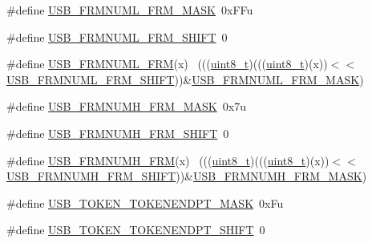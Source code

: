 \begin{DoxyCompactItemize}
\item 
\#define \hyperlink{group___u_s_b___register___masks_ga197f6ef10431b69cb9b84fe7241a318a}{U\+S\+B\+\_\+\+F\+R\+M\+N\+U\+M\+L\+\_\+\+F\+R\+M\+\_\+\+M\+A\+SK}~0x\+F\+Fu
\item 
\#define \hyperlink{group___u_s_b___register___masks_ga723c2de82420db0c349049ad6f66ad14}{U\+S\+B\+\_\+\+F\+R\+M\+N\+U\+M\+L\+\_\+\+F\+R\+M\+\_\+\+S\+H\+I\+FT}~0
\item 
\#define \hyperlink{group___u_s_b___register___masks_ga5002850109b676e53ed7862ba73b6662}{U\+S\+B\+\_\+\+F\+R\+M\+N\+U\+M\+L\+\_\+\+F\+RM}(x)                                          ~(((\hyperlink{_p_e___types_8h_aba7bc1797add20fe3efdf37ced1182c5}{uint8\+\_\+t})(((\hyperlink{_p_e___types_8h_aba7bc1797add20fe3efdf37ced1182c5}{uint8\+\_\+t})(x))$<$$<$\hyperlink{group___u_s_b___register___masks_ga723c2de82420db0c349049ad6f66ad14}{U\+S\+B\+\_\+\+F\+R\+M\+N\+U\+M\+L\+\_\+\+F\+R\+M\+\_\+\+S\+H\+I\+FT}))\&\hyperlink{group___u_s_b___register___masks_ga197f6ef10431b69cb9b84fe7241a318a}{U\+S\+B\+\_\+\+F\+R\+M\+N\+U\+M\+L\+\_\+\+F\+R\+M\+\_\+\+M\+A\+SK})
\item 
\#define \hyperlink{group___u_s_b___register___masks_ga436241a677d27ecae3001b228b51f536}{U\+S\+B\+\_\+\+F\+R\+M\+N\+U\+M\+H\+\_\+\+F\+R\+M\+\_\+\+M\+A\+SK}~0x7u
\item 
\#define \hyperlink{group___u_s_b___register___masks_gacb18c63687d37e245a79d7e7551823a3}{U\+S\+B\+\_\+\+F\+R\+M\+N\+U\+M\+H\+\_\+\+F\+R\+M\+\_\+\+S\+H\+I\+FT}~0
\item 
\#define \hyperlink{group___u_s_b___register___masks_ga34958377bceb661237ecc7ff5309def7}{U\+S\+B\+\_\+\+F\+R\+M\+N\+U\+M\+H\+\_\+\+F\+RM}(x)                                          ~(((\hyperlink{_p_e___types_8h_aba7bc1797add20fe3efdf37ced1182c5}{uint8\+\_\+t})(((\hyperlink{_p_e___types_8h_aba7bc1797add20fe3efdf37ced1182c5}{uint8\+\_\+t})(x))$<$$<$\hyperlink{group___u_s_b___register___masks_gacb18c63687d37e245a79d7e7551823a3}{U\+S\+B\+\_\+\+F\+R\+M\+N\+U\+M\+H\+\_\+\+F\+R\+M\+\_\+\+S\+H\+I\+FT}))\&\hyperlink{group___u_s_b___register___masks_ga436241a677d27ecae3001b228b51f536}{U\+S\+B\+\_\+\+F\+R\+M\+N\+U\+M\+H\+\_\+\+F\+R\+M\+\_\+\+M\+A\+SK})
\item 
\#define \hyperlink{group___u_s_b___register___masks_gaa0d3bc1d6ff63ebbccad8b898e39cc84}{U\+S\+B\+\_\+\+T\+O\+K\+E\+N\+\_\+\+T\+O\+K\+E\+N\+E\+N\+D\+P\+T\+\_\+\+M\+A\+SK}~0x\+Fu
\item 
\#define \hyperlink{group___u_s_b___register___masks_ga08c6b329c95f8ac5a39eecfbd347cce2}{U\+S\+B\+\_\+\+T\+O\+K\+E\+N\+\_\+\+T\+O\+K\+E\+N\+E\+N\+D\+P\+T\+\_\+\+S\+H\+I\+FT}~0

\end{DoxyCompactItemize}
